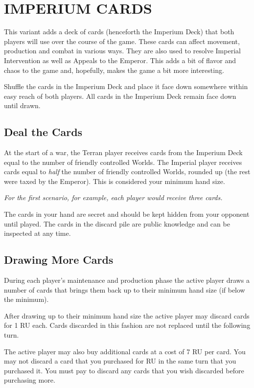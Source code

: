 \section{IMPERIUM CARDS}
\hfill

This variant adds a deck of cards (henceforth the Imperium Deck) that both players will use over the course of the game. These cards can affect movement, production and combat in various ways. They are also used to resolve Imperial Intervention as well as Appeals to the Emperor. This adds a bit of flavor and chaos to the game and, hopefully, makes the game a bit more interesting.

Shuffle the cards in the Imperium Deck and place it face down somewhere within easy reach of both players. All cards in the Imperium Deck remain face down until drawn.

\subsection{Deal the Cards}

At the start of a war, the Terran player receives cards from the Imperium Deck equal to the number of friendly controlled Worlds. The Imperial player receives cards equal to \textit{half} the number of friendly controlled Worlds, rounded up (the rest were taxed by the Emperor). This is considered your minimum hand size.

\textit{For the first scenario, for example, each player would receive three cards.}

The cards in your hand are secret and should be kept hidden from your opponent until played. The cards in the discard pile are public knowledge and can be inspected at any time.

\subsection{Drawing More Cards}

During each player's maintenance and production phase the active player draws a number of cards that brings them back up to their minimum hand size (if below the minimum).

After drawing up to their minimum hand size the active player may discard cards for 1 RU each. Cards discarded in this fashion are not replaced until the following turn.

The active player may also buy additional cards at a cost of 7 RU per card. You may not discard a card that you purchased for RU in the same turn that you purchased it. You must pay to discard any cards that you wish discarded before purchasing more.

